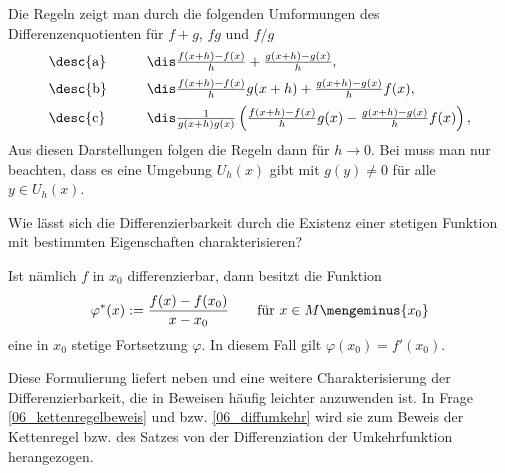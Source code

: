\begin{antwort}

\medskip\noindent
Die Regeln zeigt man durch die folgenden Umformungen des 
Differenzenquotienten für $f+g$, $fg$ und $f/g$
\[
\begin{array}{lp{3mm}l}
\text{\desc{a}} & & 
\dis \frac{f(x+h)-f(x)}{h}+\frac{g(x+h)-g(x)}{h}, \\[2mm]
\text{\desc{b}} & &
\dis \frac{f(x+h)-f(x)}{h}g(x+h)+
\frac{g(x+h)-g(x)}{h}f(x), \\[2mm]
\text{\desc{c}} & &
\dis \frac{1}{g(x+h)g(x)} 
\left( \frac{f(x+h)-f(x)}{h} g(x) -  \frac{g(x+h)-g(x)}{h} f(x) \right),
\end{array}
\]
Aus diesen Darstellungen folgen die Regeln dann für $h\to 0$.
Bei  muss man nur beachten, dass es eine Umgebung $U_h(x)$ 
gibt mit $g(y) \not= 0$ für alle 
$y\in U_h(x)$.  
\AntEnd
\end{antwort}



\begin{frage}\label{06_dif3}
Wie lässt sich die Differenzierbarkeit durch die  
Existenz einer stetigen Funktion mit bestimmten Eigenschaften 
charakterisieren?
\end{frage}

\begin{antwort}
Ist nämlich $f$ in $x_0$ differenzierbar, dann besitzt die Funktion 
\[
\varphi^*( x ) := \frac{f(x)-f(x_0)}{x-x_0}\qquad 
\text{für $x\in M \mengeminus\{ x_0 \}$}
\]
eine in $x_0$ stetige Fortsetzung $\varphi$. 
In diesem Fall gilt $\varphi(x_0)=f'(x_0)$. 

Diese Formulierung liefert neben  und  eine weitere 
Charakterisierung der Differenzierbarkeit, die in Beweisen häufig 
leichter anzuwenden ist. In Frage \ref{06_kettenregelbeweis} und bzw. 
\ref{06_diffumkehr} wird sie zum Beweis der Kettenregel 
bzw. des Satzes von der Differenziation der Umkehrfunktion
herangezogen.
\AntEnd 
\end{antwort}


